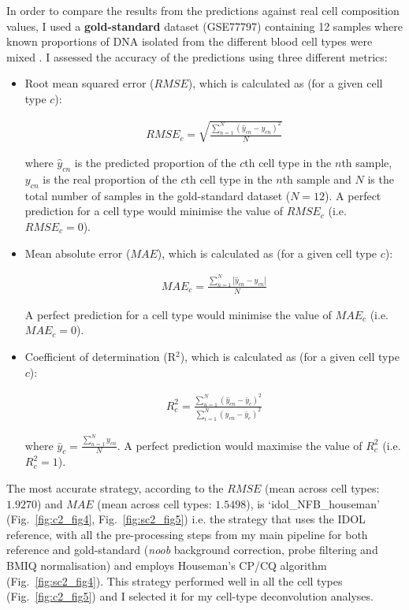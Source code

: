 In order to compare the results from the predictions against real cell composition values, I used a \textbf{gold-standard} dataset (GSE77797) containing 12 samples where known proportions of DNA isolated from the different blood cell types were mixed \cite{Koestler2016}. I assessed the accuracy of the predictions using three different metrics:

\begin{itemize}
	
	\item Root mean squared error ($RMSE$), which is calculated as (for a given cell type $c$):
	
	\begin{align}
	RMSE_c = \sqrt{\frac{\sum_{n=1}^{N} (\hat{y}_{cn} - y_{cn})^2}{N}}
	\end{align}
	
	where $\hat{y}_{cn}$ is the predicted proportion of the $c$th cell type in the $n$th sample, $y_{cn}$ is the real proportion of the $c$th cell type in the $n$th sample and $N$ is the total number of samples in the gold-standard dataset ($N=12$). A perfect prediction for a cell type would minimise the value of $RMSE_c$ (i.e. $RMSE_c = 0$).
	
	\item Mean absolute error ($MAE$), which is calculated as (for a given cell type $c$):
	
	\begin{align}
	MAE_c = \frac{\sum_{n=1}^{N} |\hat{y}_{cn} - y_{cn}|}{N}
	\end{align}
	
	A perfect prediction for a cell type would minimise the value of $MAE_c$ (i.e. $MAE_c = 0$).
	
	\item Coefficient of determination (R$^2$), which is calculated as (for a given cell type $c$):
	
	\begin{align}
	R^2_c = \frac{\sum_{n=1}^{N} (\hat{y}_{cn} - \bar{y}_c)^2}{\sum_{i=1}^{N} (y_{cn} - \bar{y}_c)^2}
	\end{align}
	
	where $\bar{y}_c = \frac{\sum_{n=1}^{N} y_{cn}}{N}$. A perfect prediction would maximise the value of $R^2_c$ (i.e. $R^2_c=1$).
	
\end{itemize}


The most accurate strategy, according to the $RMSE$ (mean across cell types: $1.9270$) and $MAE$ (mean across cell types: $1.5498$), is `idol\_NFB\_houseman' (Fig.~\ref{fig:c2_fig4}, Fig.~\ref{fig:sc2_fig5}) i.e. the strategy that uses the IDOL reference, with all the pre-processing steps from my main pipeline for both reference and gold-standard (\textit{noob} background correction, probe filtering and BMIQ normalisation) and employs Houseman's CP/CQ algorithm (Fig.~\ref{fig:sc2_fig4}). This strategy performed well in all the cell types (Fig.~\ref{fig:c2_fig5}) and I selected it for my cell-type deconvolution analyses. 

